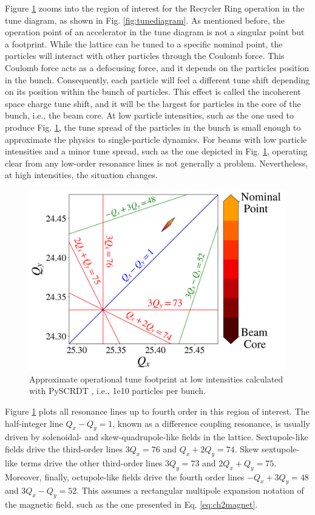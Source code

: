 Figure \ref{fig:rrtdlow} zooms into the region of interest for the Recycler Ring operation in the tune diagram, as shown in Fig. \ref{fig:tunediagram}. As mentioned before, the operation point of an accelerator in the tune diagram is not a singular point but a footprint. While the lattice can be tuned to a specific nominal point, the particles will interact with other particles through the Coulomb force. This Coulomb force acts as a defocusing force, and it depends on the particles position in the bunch. Consequently, each particle will feel a different tune shift depending on its position within the bunch of particles. This effect is called the incoherent space charge tune shift, and it will be the largest for particles in the core of the bunch, i.e., the beam core. At low particle intensities, such as the one used to produce Fig. \ref{fig:rrtdlow}, the tune spread of the particles in the bunch is small enough to approximate the physics to single-particle dynamics. For beams with low particle intensities and a minor tune spread, such as the one depicted in Fig. \ref{fig:rrtdlow}, operating clear from any low-order resonance lines is not generally a problem. Nevertheless, at high intensities, the situation changes.   

 \begin{figure}[H]
    \centering
    \includegraphics[width=\columnwidth]{chapter2/rrtdlow.png}
    \caption{Approximate operational tune footprint at low intensities calculated with PySCRDT \cite{pyscrdt}, i.e., 1e10 particles per bunch.}
    \label{fig:rrtdlow}
 \end{figure}

Figure \ref{fig:rrtdlow} plots all resonance lines up to fourth order in this region of interest. The half-integer line $Q_x-Q_y=1$, known as a difference coupling resonance, is usually driven by solenoidal- and skew-quadrupole-like fields in the lattice. Sextupole-like fields drive the third-order lines $3Q_x=76$ and $Q_x+2Q_y=74$. Skew sextupole-like terms drive the other third-order lines $3Q_y=73$ and $2Q_x+Q_y=75$. Moreover, finally, octupole-like fields drive the fourth order lines $-Q_x+3Q_y=48$ and $3Q_x-Q_y=52$. This assumes a rectangular multipole expansion notation of the magnetic field, such as the one presented in Eq. \ref{eq:ch2magnet}.      

